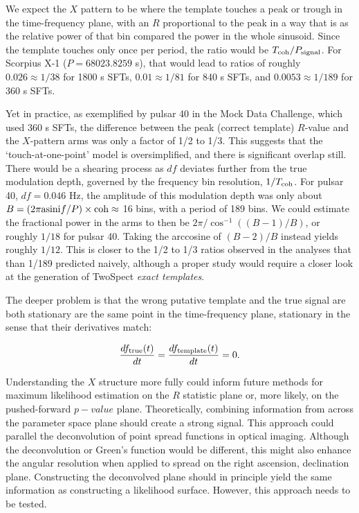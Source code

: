 We expect the $X$ pattern to be where the template touches a peak or trough in the time-frequency plane, with an $R$ proportional to the peak in a way that is as the relative power of that bin compared the power in the whole sinusoid. 
Since the template touches only once per period, the ratio would be $T_{\textup{coh}} / P_{\textup{signal}}$. For Scorpius X-1 ($P = 68023.8259$ s), that would lead to ratios of roughly $0.026 \approx 1/38$ for 1800 s SFTs, $0.01 \approx 1/81$ for 840 s SFTs, and $0.0053 \approx 1/189$ for 360 s SFTs.

Yet in practice, as exemplified by pulsar 40 in the Mock Data Challenge, which used 360 s SFTs, the difference between the peak (correct template) $R$-value and the $X$-pattern arms was only a factor of 1/2 to 1/3.
This suggests that the `touch-at-one-point' model is oversimplified, and there is significant overlap still.
There would be a shearing process as $df$ deviates further from the true modulation depth, governed by the frequency bin resolution, $1/T_\textup{coh}$. 
For pulsar 40, $df = 0.046$ Hz, the amplitude of this modulation depth was only about $B = \left(2 \pi \textup{asini} f / P \right) \times \textup{coh} \approx $ 16 bins, with a period of 189 bins.
We could estimate the fractional power in the arms to then be $2 \pi / \cos^{-1} ((B-1) / B)$, or roughly $1/18$ for pulsar 40.
Taking the arccosine of $(B-2)/B$ instead yields roughly $1/12$.
This is closer to the 1/2 to 1/3 ratios observed in the analyses that than 1/189 predicted naively, although a proper study would require a closer look at the generation of TwoSpect \textit{exact templates}.

The deeper problem is that the wrong putative template and the true signal are both stationary are the same point in the time-frequency plane, stationary in the sense that their derivatives match:

\begin{equation}
\frac{df_\textup{true} (t)}{dt} = \frac{df_\textup{template}(t)}{dt} = 0.
\end{equation}

Understanding the $X$ structure more fully could inform future methods for maximum likelihood estimation on the $R$ statistic plane or, more likely, on the pushed-forward $p-value$ plane.
Theoretically, combining information from across the parameter space plane should create a strong signal.
This approach could parallel the deconvolution of point spread functions in optical imaging.
Although the deconvolution or Green's function would be different, this might also enhance the angular resolution when applied to spread on the right ascension, declination plane.
Constructing the deconvolved plane should in principle yield the same information as constructing a likelihood surface.
However, this approach needs to be tested.

